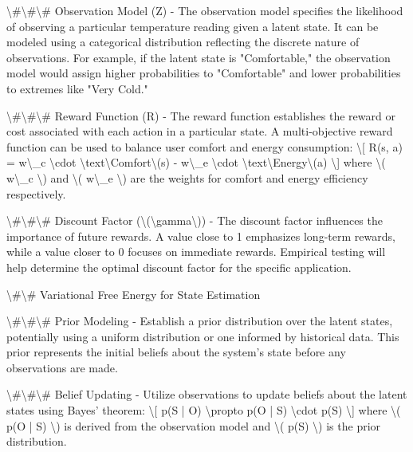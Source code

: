 \documentclass[11pt,a4paper]{article}
\begin{document}
\textbackslash{}#\textbackslash{}#\textbackslash{}# Observation Model (Z)
- The observation model specifies the likelihood of observing a particular temperature reading given a latent state. It can be modeled using a categorical distribution reflecting the discrete nature of observations. For example, if the latent state is "Comfortable," the observation model would assign higher probabilities to "Comfortable" and lower probabilities to extremes like "Very Cold."

\textbackslash{}#\textbackslash{}#\textbackslash{}# Reward Function (R)
- The reward function establishes the reward or cost associated with each action in a particular state. A multi-objective reward function can be used to balance user comfort and energy consumption:
   \textbackslash{}[
   R(s, a) = w\textbackslash{}_c \textbackslash{}cdot \textbackslash{}text\textbackslash{}{Comfort\textbackslash{}}(s) - w\textbackslash{}_e \textbackslash{}cdot \textbackslash{}text\textbackslash{}{Energy\textbackslash{}}(a)
   \textbackslash{}]
   where \textbackslash{}( w\textbackslash{}_c \textbackslash{}) and \textbackslash{}( w\textbackslash{}_e \textbackslash{}) are the weights for comfort and energy efficiency respectively.

\textbackslash{}#\textbackslash{}#\textbackslash{}# Discount Factor (\textbackslash{}(\textbackslash{}gamma\textbackslash{}))
- The discount factor influences the importance of future rewards. A value close to 1 emphasizes long-term rewards, while a value closer to 0 focuses on immediate rewards. Empirical testing will help determine the optimal discount factor for the specific application.

\textbackslash{}#\textbackslash{}# Variational Free Energy for State Estimation

\textbackslash{}#\textbackslash{}#\textbackslash{}# Prior Modeling
- Establish a prior distribution over the latent states, potentially using a uniform distribution or one informed by historical data. This prior represents the initial beliefs about the system's state before any observations are made.

\textbackslash{}#\textbackslash{}#\textbackslash{}# Belief Updating
- Utilize observations to update beliefs about the latent states using Bayes' theorem:
   \textbackslash{}[
   p(S | O) \textbackslash{}propto p(O | S) \textbackslash{}cdot p(S)
   \textbackslash{}]
   where \textbackslash{}( p(O | S) \textbackslash{}) is derived from the observation model and \textbackslash{}( p(S) \textbackslash{}) is the prior distribution.
\end{document}
